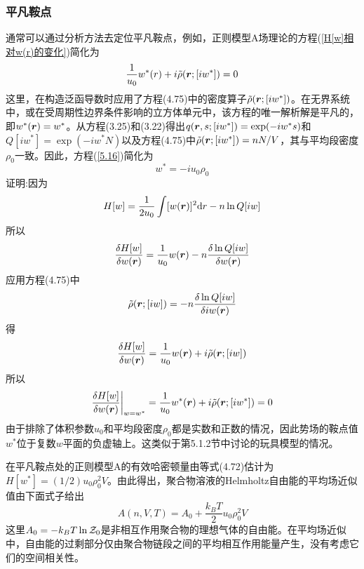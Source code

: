 \subsubsection{平凡鞍点}
通常可以通过分析方法去定位平凡鞍点，例如，正则模型A场理论的方程(\ref{H[w]相对w(r)的变化})简化为
\begin{equation}\label{5.16}
\frac{1}{u_0}w^*(r)+i\tilde{\rho}(\bm{r};[iw^*])=0
\end{equation}
这里，在构造泛函导数时应用了方程(4.75)中的密度算子$\tilde{\rho}(\bm{r};[iw^*])$。在无界系统中，或在受周期性边界条件影响的立方体单元中，该方程的唯一解析解是平凡的，即$w^*(\bm{r})=w^*$。从方程(3.25)和(3.22)得出$q(\bm{r},s;[iw^*])=\exp(-iw^*s)$和$Q[iw^*]=\exp(-iw^*N)$以及方程(4.75)中$\tilde{\rho}(\bm{r};[iw^*])=nN/V$，其与平均段密度$\rho_0$一致。因此，方程(\ref{5.16})简化为
\begin{equation}\label{5.17}
w^*=-iu_0\rho_0
\end{equation}
证明:因为
\begin{equation*}
H[w]=\frac{1}{2u_0}\int[w(\bm{r})]^2\mathrm{d}r-n\ln Q[iw]
\end{equation*}
所以
\begin{equation*}
\frac{\delta H[w]}{\delta w(\bm{r})}=\frac{1}{u_0}w(\bm{r})-n\frac{\delta\ln Q[iw]}{\delta w(\bm{r})}
\end{equation*}
应用方程(4.75)中
\begin{equation*}
\tilde{\rho}(\bm{r};[iw])=-n\frac{\delta\ln Q[iw]}{\delta iw(\bm{r})}
\end{equation*}
得
\begin{equation*}
\frac{\delta H[w]}{\delta w(\bm{r})}=\frac{1}{u_0}w(\bm{r})+i\tilde{\rho}(\bm{r};[iw])
\end{equation*}
所以
\begin{equation*}
\frac{\delta H[w]}{\delta w(\bm{r})}\bigg|_{w=w^*}=\frac{1}{u_0}w^*(\bm{r})+i\tilde{\rho}(\bm{r};[iw^*])=0
\end{equation*}
由于排除了体积参数$u_0$和平均段密度$\rho_0$都是实数和正数的情况，因此势场的鞍点值$w^*$位于复数$w$平面的负虚轴上。这类似于第5.1.2节中讨论的玩具模型的情况。

在平凡鞍点处的正则模型A的有效哈密顿量由等式(4.72)估计为$H[w^*]=(1/2)u_0\rho_0^2V$。由此得出，聚合物溶液的Helmholtz自由能的平均场近似值由下面式子给出
\begin{equation}
A(n,V,T)=A_0+\frac{k_BT}{2}u_0\rho_0^2V
\end{equation}
这里$A_0=-k_BT\ln\mathcal{Z}_0$是非相互作用聚合物的理想气体的自由能。在平均场近似中，自由能的过剩部分仅由聚合物链段之间的平均相互作用能量产生，没有考虑它们的空间相关性。


